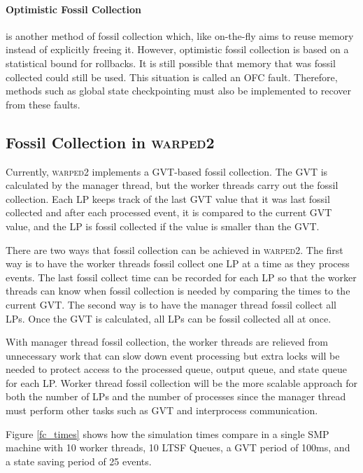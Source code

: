 \documentclass[11pt]{book}
\begin{document}
\paragraph{Optimistic Fossil Collection} is another method of fossil collection which, like
on-the-fly aims to reuse memory instead of explicitly freeing it. However, optimistic fossil
collection is based on a statistical bound for rollbacks. It is still possible that memory that
was fossil collected could still be used. This situation is called an OFC fault. Therefore,
methods such as global state checkpointing must also be implemented to recover from these faults.

\subsection{Fossil Collection in \textsc{warped2}}

Currently, \textsc{warped2} implements a GVT-based fossil collection. The GVT is calculated by
the manager thread, but the worker threads carry out the fossil collection. Each LP keeps track
of the last GVT value that it was last fossil collected and after each processed event, it is
compared to the current GVT value, and the LP is fossil collected if the value is smaller than
the GVT.

There are two ways that fossil collection can be achieved in \textsc{warped2}. The first way
is to have the worker threads fossil collect one LP at a time as they process events. The last
fossil collect time can be recorded for each LP so that the worker threads can know when fossil
collection is needed by comparing the times to the current GVT. The second way is to have the
manager thread fossil collect all LPs. Once the GVT is calculated, all LPs can be fossil collected
all at once.

With manager thread fossil collection, the worker threads are relieved from unnecessary work
that can slow down event processing but extra locks will be needed to protect access to the
processed queue, output queue, and state queue for each LP. Worker thread fossil collection
will be the more scalable approach for both the number of LPs and the number of processes since
the manager thread must perform other tasks such as GVT and interprocess communication.

Figure \ref{fc_times} shows how the simulation times compare in a single SMP machine with
10 worker threads, 10 LTSF Queues, a GVT period of 100ms, and a state saving period of 25 events.
\end{document}
